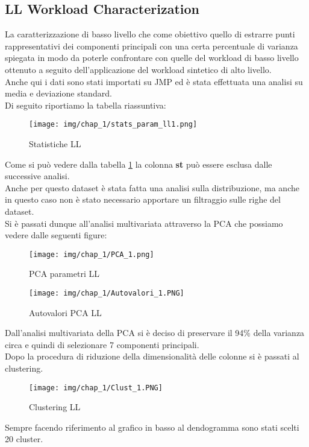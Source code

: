 \subsection{LL Workload Characterization}
La caratterizzazione di basso livello che come obiettivo quello di estrarre punti rappresentativi dei componenti principali con una certa percentuale di varianza spiegata in modo da poterle confrontare con quelle del workload di basso livello ottenuto a seguito dell'applicazione del workload sintetico di alto livello.\\
Anche qui i dati sono stati importati su JMP ed è stata effettuata una analisi su media e deviazione standard.\\
Di seguito riportiamo la tabella riassuntiva:
\begin{figure}[H]
    \centering
    \texttt{[image: img/chap\_1/stats\_param\_ll1.png]}
    \caption{Statistiche LL}
    \label{fig:ll_stats}
\end{figure}
\noindent
Come si può vedere dalla tabella \ref{fig:ll_stats} la colonna \textbf{st} può essere esclusa dalle successive analisi.\\
Anche per questo dataset è stata fatta una analisi sulla distribuzione, ma anche in questo caso non è stato necessario apportare un filtraggio sulle righe del dataset.\\
Si è passati dunque all'analisi multivariata attraverso la PCA che possiamo vedere dalle seguenti figure:
\begin{figure}[H]
    \centering
    \texttt{[image: img/chap\_1/PCA\_1.png]}
    \caption{PCA parametri LL}
    \label{fig:pca_ll}
\end{figure}
\noindent
\begin{figure}[H]
    \centering
    \texttt{[image: img/chap\_1/Autovalori\_1.PNG]}
    \caption{Autovalori PCA LL}
    \label{fig:autoval_ll}
\end{figure}
\noindent
Dall'analisi multivariata della PCA si è deciso di preservare il 94\% della varianza circa e quindi di selezionare 7 componenti principali.\\
Dopo la procedura di riduzione della dimensionalità delle colonne si è passati al clustering.\\
\begin{figure}[H]
    \centering
    \texttt{[image: img/chap\_1/Clust\_1.PNG]}
    \caption{Clustering LL}
    \label{fig:clust_ll}
\end{figure}
\noindent
Sempre facendo riferimento al grafico in basso al dendogramma sono stati scelti 20 cluster.\\
